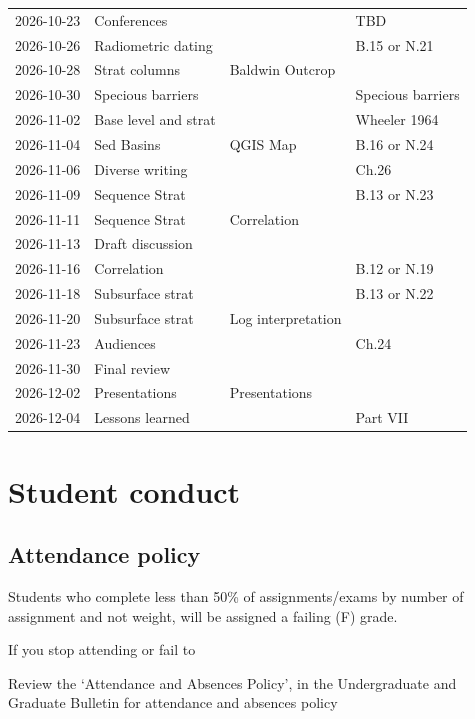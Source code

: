 \documentclass[11pt,]{article}
\begin{document}
\begin{table}[!h]
\begin{tabular}{l>{\raggedright\arraybackslash}p{4cm}>{\raggedright\arraybackslash}p{4cm}>{\raggedright\arraybackslash}p{4cm}}
2026-10-23 & Conferences &  & TBD\\
2026-10-26 & Radiometric dating &  & B.15 or N.21\\
2026-10-28 & Strat columns & Baldwin Outcrop & \\
2026-10-30 & Specious barriers &  & Specious barriers\\
2026-11-02 & Base level and strat &  & Wheeler 1964\\
2026-11-04 & Sed Basins & QGIS Map & B.16 or N.24\\
2026-11-06 & Diverse writing &  & Ch.26\\
2026-11-09 & Sequence Strat &  & B.13 or N.23\\
2026-11-11 & Sequence Strat & Correlation & \\
2026-11-13 & Draft discussion &  & \\
2026-11-16 & Correlation &  & B.12 or N.19\\
2026-11-18 & Subsurface strat &  & B.13 or N.22\\
2026-11-20 & Subsurface strat & Log interpretation & \\
2026-11-23 & Audiences &  & Ch.24\\
2026-11-30 & Final review &  & \\
2026-12-02 & Presentations & Presentations & \\
2026-12-04 & Lessons learned &  & Part VII\\
\bottomrule
\end{tabular}
\end{table}

\newpage

\section{Student conduct}\label{student-conduct}

\subsection{Attendance policy}\label{attendance-policy}

Students who complete less than 50\% of assignments/exams by number of
assignment and not weight, will be assigned a failing (F) grade.

If you stop attending or fail to

Review the `Attendance and Absences Policy', in the Undergraduate and
Graduate Bulletin for attendance and absences policy
\end{document}
